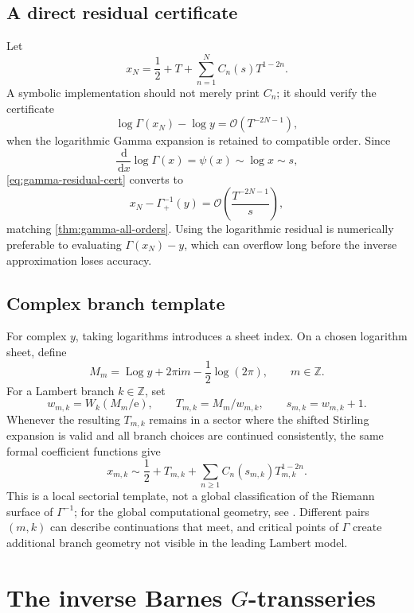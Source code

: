 \documentclass[11pt]{article}
\theoremstyle{definition}
\theoremstyle{remark}
\newcommand{\e}{\mathrm e}
\newcommand{\ii}{\mathrm i}
\newcommand{\dd}{\,\mathrm d}
\newcommand{\BigO}{\mathcal O}
\newcommand{\Gaminv}{\Gamma_{+}^{-1}}
\newcommand{\Log}{\operatorname{Log}}
\begin{document}
\subsection{A direct residual certificate}

Let
\[
 x_N=\frac12+T+\sum_{n=1}^{N}C_n(s)T^{1-2n}.
\]
A symbolic implementation should not merely print \(C_n\); it should verify the certificate
\begin{equation}\label{eq:gamma-residual-cert}
 \log\Gamma(x_N)-\log y
 =\BigO\!\left(T^{-2N-1}\right),
\end{equation}
when the logarithmic Gamma expansion is retained to compatible order.  Since
\[
 \frac{\dd}{\dd x}\log\Gamma(x)=\psi(x)\sim\log x\sim s,
\]
\cref{eq:gamma-residual-cert} converts to
\[
 x_N-\Gaminv(y)=\BigO\!\left(\frac{T^{-2N-1}}{s}\right),
\]
matching \cref{thm:gamma-all-orders}.  Using the logarithmic residual is numerically preferable to evaluating \(\Gamma(x_N)-y\), which can overflow long before the inverse approximation loses accuracy.

\subsection{Complex branch template}\label{sec:gamma-complex}

For complex \(y\), taking logarithms introduces a sheet index.  On a chosen logarithm sheet, define
\[
 M_m=\Log y+2\pi\ii m-\frac12\log(2\pi),
 \qquad m\in\mathbb Z.
\]
For a Lambert branch \(k\in\mathbb Z\), set
\[
 w_{m,k}=W_k(M_m/\e),
 \qquad T_{m,k}=M_m/w_{m,k},
 \qquad s_{m,k}=w_{m,k}+1.
\]
Whenever the resulting \(T_{m,k}\) remains in a sector where the shifted Stirling expansion is valid and all branch choices are continued consistently, the same formal coefficient functions give
\begin{equation}\label{eq:gamma-complex-template}
 x_{m,k}\sim\frac12+T_{m,k}
 +\sum_{n\ge1}C_n(s_{m,k})T_{m,k}^{1-2n}.
\end{equation}
This is a local sectorial template, not a global classification of the Riemann surface of \(\Gamma^{-1}\); for the global computational geometry, see \cite{JeffreyWatt}.  Different pairs \((m,k)\) can describe continuations that meet, and critical points of \(\Gamma\) create additional branch geometry not visible in the leading Lambert model.

\section{The inverse Barnes \texorpdfstring{\(G\)}{G}-transseries}\label{sec:barnes}
\end{document}
